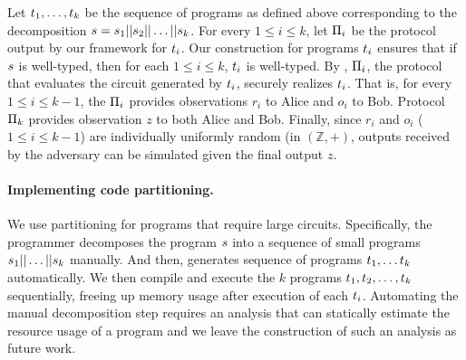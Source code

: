  Let $t_1, \ldots, t_k$ be the
sequence of programs as defined above corresponding to the
decomposition $s = s_1||s_2||\ldots||s_k$.  For every
$1\leq i\leq k$, let $\Pi_i$ be the \mpc protocol output by our
framework for $t_i$. Our construction for programs $t_i$
ensures that if $s$ is well-typed, then for each $1\leq i \leq k$,
$t_i$ is well-typed. By , $\Pi_i$,
the \mpc protocol that evaluates the circuit generated by $t_i$,
securely realizes $t_i$. That is, for every $1\leq i \leq k-1$,
the $\Pi_i$ provides observations $r_i$ to Alice and $o_i$
to Bob. Protocol $\Pi_k$ provides observation $z$ to both Alice
and Bob. Finally, since $r_i$ and $o_i$ ($1\leq i\leq k-1$) are
individually uniformly random (in $(\mathbb{Z},+)$, outputs received
by the adversary can be simulated given the final output $z$.


%

\paragraph{Implementing code partitioning.}
We use partitioning for programs that require large
circuits. Specifically, the programmer decomposes the program
$s$ into a sequence of small programs
$s_1||\dots||s_k$ manually. And then, \tool generates
sequence of programs $t_1,\dots t_k$ automatically. We then
compile and execute the $k$ programs
$t_1,t_2,\ldots,t_k$ sequentially, freeing up memory
usage after execution of each $t_i$.
Automating the manual decomposition step requires an analysis that can 
statically estimate the resource usage of a \tool program and we leave
the construction of such an analysis as future work.%
